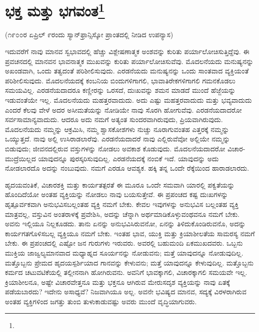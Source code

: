 
\chapter[ಭಕ್ತ ಮತ್ತು ಭಗವಂತ]{ಭಕ್ತ ಮತ್ತು ಭಗವಂತ\protect\footnote{}}

\begin{center}
(೧೯೦೦ರ ಏಪ್ರಿಲ್ ೯ರಂದು ಸ್ಯಾನ್‌ಫ್ರಾನ್ಸಿಸ್ಕೋ ಪ್ರಾಂತದಲ್ಲಿ ನೀಡಿದ ಉಪನ್ಯಾಸ)
\end{center}

ಇದುವರೆಗೆ ನಾವು ಮಾನವ ಸ್ವಭಾವದಲ್ಲಿ ಹೆಚ್ಚು ವಿಶ್ಲೇಷಣಾತ್ಮಕ ಅಂಶವನ್ನು ಕುರಿತು ಪರ್ಯಾಲೋಚಿಸುತ್ತಿದ್ದೆವು. ಈ ಪ್ರವಚನದಲ್ಲಿ ಮಾನವನ ಭಾವನಾತ್ಮಕ ಮುಖವನ್ನು ಕುರಿತು ಪರ್ಯಾಲೋಚಿಸುವೆವು. ಮೊದಲನೆಯದು ಮನುಷ್ಯನನ್ನು ಅಖಂಡವಾಗಿ, ಒಂದು ತತ್ವದಂತೆ ಪರಿಶೀಲಿಸುವುದು. ಎರಡನೆಯದು ಮನುಷ್ಯನನ್ನು ಒಂದು ಸಾಂತವಾದ ವ್ಯಕ್ತಿಯಂತೆ ಪರಿಶೀಲಿಸುವುದು. ಮೊದಲನೆಯದಕ್ಕೆ ಕಂಬನಿಯ ಬಿಂದುಗಳಿಗಾಗಲಿ, ಭಾವಾತಿರೇಕಗಳಿಗಾಗಲಿ ಗಮನಕೊಡಲು ಸಮಯವಿಲ್ಲ. ಎರಡನೆಯದಾದರೂ ಕಣ್ಣೀರನ್ನು ಒರಸದೆ, ದುಃಖವನ್ನು ಶಮನ ಮಾಡದೆ ಮುಂದೆ ಹೆಜ್ಜೆಯನ್ನು ಇಡುವಂತೆಯೇ ಇಲ್ಲ. ಮೊದಲನೆಯದು ಮಹತ್ತರವಾದುದು. ಅದು ಎಷ್ಟು ಮಹತ್ತರವಾದುದು ಮತ್ತು ಭವ್ಯವಾದುದು ಎಂದರೆ ಕೆಲವು ವೇಳೆ ಅದರ ಅಸೀಮತೆಯನ್ನು ನೋಡಿಯೇ ನಾವು ಸೊರಗಿ ಹೋಗುವೆವು. ಎರಡನೆಯದಾದರೋ ಸರ್ವಸಾಮಾನ್ಯವಾದುದು. ಆದರೂ ಅದು ನಮಗೆ ಅತ್ಯಂತ ಸುಂದರವಾಗಿರುವುದು, ಪ್ರಿಯವಾಗಿರುವುದು. ಮೊದಲನೆಯದು ನಮ್ಮನ್ನು ಆಕ್ರಮಿಸಿ, ನಮ್ಮ ಶ್ವಾಸಕೋಶಗಳು ನುಚ್ಚು ನೂರಾಗುವಂತಹ ಎತ್ತರಕ್ಕೆ ನಮ್ಮನ್ನು ಒಯ್ಯುತ್ತದೆ. ನಾವು ಅಲ್ಲಿ ಉಸಿರಾಡಲಾರೆವು. ಎರಡನೆಯದಾದರೆ ನಾವು ಎಲ್ಲಿರುವೆವೋ ಅಲ್ಲಿಯೇ ನಮ್ಮನ್ನು ಬಿಡುವುದು; ಜೀವನದಲ್ಲಿರುವ ವಸ್ತುಗಳನ್ನು ನೋಡಲು ಅವಕಾಶ ಕೊಡುವುದು. ಮೊದಲನೆಯದಾದರೋ ವಿಚಾರ-ಮುದ್ರೆಯಿಲ್ಲದ ಯಾವುದನ್ನೂ ಪುರಸ್ಕರಿಸುವುದಿಲ್ಲ. ಎರಡನೆಯದಕ್ಕೆ ನಂಬಿಕೆ ಇದೆ. ಯಾವುದನ್ನು ಅದು ನೋಡಲಾರದೊ ಅದನ್ನು ನಂಬುವುದು. ನಮಗೆ ಎರಡೂ ಆವಶ್ಯಕ. ಹಕ್ಕಿ ತನ್ನ ಒಂದೇ ರೆಕ್ಕೆಯಿಂದ ಹಾರಾಡಲಾರದು.

ಹೃದಯವಂತಿಕೆ, ವಿಚಾರಶಕ್ತಿ ಮತ್ತು ಕಾರ್ಯತತ್ಪರತೆ ಈ ಮೂರೂ ಒಂದೇ ಸಮವಾಗಿ ಯಾರಲ್ಲಿ ಪಕ್ವತೆಯನ್ನು ಹೊಂದಿದೆಯೋ ಅಂತಹ ವ್ಯಕ್ತಿಯನ್ನು ನೋಡಲು ನಾವು ಬಯಸುತ್ತೇವೆ. ಈ ಪ್ರಪಂಚದ ಕಷ್ಟ ದುಃಖಗಳನ್ನು ಹೃತ್ಪೂರ್ವಕವಾಗಿ ಅನುಭವಿಸಬಲ್ಲಂತಹ ವ್ಯಕ್ತಿ ನಮಗೆ ಬೇಕು. ಕೇವಲ ಇವುಗಳನ್ನು ಅನುಭವಿಸ ಬಲ್ಲಂತಹ ವ್ಯಕ್ತಿ ಮಾತ್ರವಲ್ಲ, ವಸ್ತುವಿನ ಅಂತರಾಳಕ್ಕೆ ಪ್ರವೇಶಿಸಿ, ಅದನ್ನು ಚೆನ್ನಾಗಿ ಅರ್ಥಮಾಡಿಕೊಳ್ಳುವಂಥವನೂ ನಮಗೆ ಬೇಕು. ಅವನು ಇಲ್ಲಿಯೂ ನಿಲ್ಲಕೂಡದು. ತಾನು ಏನನ್ನು ಅನುಭವಿಸಿರುವನೋ, ಏನನ್ನು ತಿಳಿದುಕೊಂಡಿರುವನೊ, ಅದನ್ನು ಕಾರ್ಯಗತಗೊಳಿಸಬಲ್ಲ ವ್ಯಕ್ತಿಯೂ ನಮಗೆ ಬೇಕು. ಇಂತಹ ಭಾವ, ಯುಕ್ತಿ ಮತ್ತು ಕ್ರಿಯಾಶೀಲತೆಯ ಸಾಮರಸ್ಯ ನಮಗೆ ಬೇಕು. ಈ ಪ್ರಪಂಚದಲ್ಲಿ ಎಷ್ಟೋ ಜನ ಗುರುಗಳು ಇರುವರು. ಅವರಲ್ಲಿ ಬಹುಮಂದಿ ಏಕಮುಖದವರು. ಒಬ್ಬನು ಮುಕ್ತಿಯ ಜಾಜ್ವಲ್ಯಮಾನವಾದ ಮಧ್ಯಾಹ್ನದ ಸೂರ್ಯನನ್ನು ನೋಡುವನು; ಮತ್ತೆ ಯಾವುದನ್ನೂ ನೋಡುವುದಿಲ್ಲ. ಮತ್ತೊಬ್ಬನು ಪ್ರೇಮದ ಹೃದಯಸ್ಪರ್ಶಿಯಾದ ಗಾನವನ್ನು ಕೇಳುವನು; ಮತ್ತೆ ಯಾವುದನ್ನೂ ಕೇಳುವುದಿಲ್ಲ. ಮತ್ತೊಬ್ಬನು ಕರ್ಮದ ಚಟುವಟಿಕೆಯಲ್ಲಿ ತಲ್ಲೀನನಾಗಿ ಹೋಗಿರುವನು. ಅವನಿಗೆ ಭಾವಕ್ಕಾಗಲಿ, ವಿಚಾರಕ್ಕಾಗಲಿ ಸಮಯವೇ ಇಲ್ಲ. ಕ್ರಿಯಾಶೀಲನೂ, ಅಷ್ಟೇ ವಿಚಾರವೇತ್ತನೂ ಮತ್ತು ಭಕ್ತನೂ ಆಗಿರುವ ಮೇರುಸದೃಶ ವ್ಯಕ್ತಿಯನ್ನು ನಾವು ಏತಕ್ಕೆ ಪಡೆಯಬಾರದು? ಇದೇನು ಅಸಾಧ್ಯವೆ? ನಿಜವಾಗಿಯೂ ಅಲ್ಲ. ಅವನೇ ಭವಿಷ್ಯದ ಮಾನವ, ಸದ್ಯಕ್ಕೆ ವಿರಳರಾಗಿರುವ ಅಂತಹ ವ್ಯಕ್ತಿಗಳಿಂದ ಜಗತ್ತು ತುಂಬಿ ತುಳುಕಾಡುವಷ್ಟು ಅವರು ಮುಂದೆ ವೃದ್ಧಿಯಾಗುವರು.

